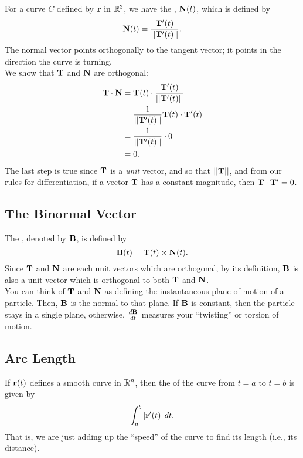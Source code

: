For a curve \(C\) defined by \(\mathbf{r}\) in \(\mathbb{R}^{3}\), we have the , \(\mathbf{N}(t)\), which is defined by 
\[
    \mathbf{N}(t) = \frac{\mathbf{T}'(t)}{||\mathbf{T}'(t)||}.
\]
The normal vector points orthogonally to the tangent vector; it points in the direction the curve is turning. \\

We show that \(\mathbf{T}\) and \(\mathbf{N}\) are orthogonal:
\begin{align*}
    \mathbf{T} \cdot \mathbf{N} &= \mathbf{T}(t) \cdot \frac{\mathbf{T}'(t)}{||\mathbf{T}'(t)||} \\
    &= \frac{1}{||\mathbf{T}'(t)||} \mathbf{T}(t) \cdot \mathbf{T}'(t) \\
    &= \frac{1}{||\mathbf{T}'(t)||} \cdot 0 \\
    &= 0.
\end{align*}
The last step is true since \(\mathbf{T}\) is a \textit{unit} vector, and so that \(||\mathbf{T}||\), and from our rules for differentiation, if a vector \(\mathbf{T}\) has a constant magnitude, then \(\mathbf{T} \cdot \mathbf{T}' = 0\).

\subsection{The Binormal Vector}

The , denoted by \(\mathbf{B}\), is defined by
\[
    \mathbf{B}(t) = \mathbf{T}(t) \times \mathbf{N}(t).
\]
Since \(\mathbf{T}\) and \(\mathbf{N}\) are each unit vectors which are orthogonal, by its definition, \(\mathbf{B}\) is also a unit vector which is orthogonal to both \(\mathbf{T}\) and \(\mathbf{N}\). \\

You can think of \(\mathbf{T}\) and \(\mathbf{N}\) as defining the instantaneous plane of motion of a particle. Then, \(\mathbf{B}\) is the normal to that plane. If \(\mathbf{B}\) is constant, then the particle stays in a single plane, otherwise, \(\frac{d\mathbf{B}}{dt}\) measures your ``twisting'' or torsion of motion.

\subsection{Arc Length}

If \(\mathbf{r}(t)\) defines a smooth curve in \(\mathbb{R}^{n}\), then the  of the curve from \(t = a\) to \(t = b\) is given by
\[
    \int_{a}^{b} |\mathbf{r}'(t)| \, dt.
\]
That is, we are just adding up the ``speed'' of the curve to find its length (i.e., its distance).

